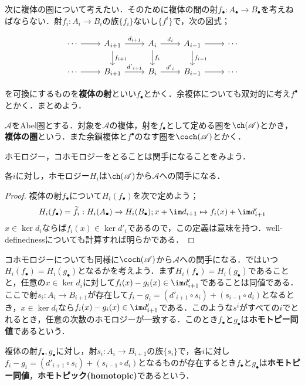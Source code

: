 
次に複体の圏について考えたい．そのために複体の間の射$f_\bullet:A_\bullet\to B_\bullet$を考えねばならない．射$f_i:A_i\to B_i$の族$\{f_i\}$ないし$\{f^i\}$で，次の図式；

\[\begin{tikzcd}
	\cdots\arrow[r]&A_{i+1}\arrow[r,"d_{i+1}"]\arrow[d,"f_{i+1}"]&A_i\arrow[r,"d_i"]\arrow[d,"f_i"]&A_{i-1}\arrow[r]\arrow[d,"f_{i-1}"]&\cdots\\
	\cdots\arrow[r]&B_{i+1}\arrow[r,"{d'}_{i+1}"]&B_i\arrow[r,"{d'}_{i}"]&B_{i-1}\arrow[r]&\cdots
\end{tikzcd}\]

を可換にするものを\textbf{複体の射}といい$f_\bullet$とかく．余複体についても双対的に考え$f^\bullet$とかく．まとめよう．
\begin{defi}[複体の圏]
	$\mathscr{A}$をAbel圏とする．対象を$\mathscr{A}$の複体，射を$f_\bullet$として定める圏を$\ch(\mathscr{A})$とかき，\textbf{複体の圏}という．また余鎖複体と$f^\bullet$のなす圏を$\coch(\mathscr{A})$とかく．
\end{defi}

ホモロジー，コホモロジーをとることは関手になることをみよう．
\begin{prop}
	各$i$に対し，ホモロジー$H_i$は$\ch(\mathscr{A})$から$\mathscr{A}$への関手になる．
\end{prop}
\begin{proof}
	複体の射$f_\bullet$について$H_i(f_\bullet)$を次で定めよう；
	\[H_i(f_\bullet)=\widetilde{f}_i:H_i(A_\bullet)\to H_i(B_\bullet);x+\im d_{i+1}\mapsto f_i(x)+\im d_{i+1}'\]
	$x\in\ker d_i$ならば$f_i(x)\in\ker d'_i$であるので，この定義は意味を持つ．well-definednessについても計算すれば明らかである．
\end{proof}

コホモロジーについても同様に$\coch(\mathscr{A})$から$\mathscr{A}$への関手になる．ではいつ$H_i(f_\bullet)=H_i(g_\bullet)$となるかを考えよう．まず$H_i(f_\bullet)=H_i(g_\bullet)$であることと，任意の$x\in\ker d_i$に対して$f_i(x)-g_i(x)\in\im d'_{i+1}$であることは同値である．ここで射$s_i:A_i\to B_{i+1}$が存在して$f_i-g_i=(d'_{i+1}\circ s_i)+(s_{i-1}\circ d_i)$となるとき，$x\in\ker d_i$なら$f_i(x)-g_i(x)\in\im d'_{i+1}$である．このような$s^i$がすべての$i$でとれるとき，任意の次数のホモロジーが一致する．このとき$f_\bullet$と$g_\bullet$は\textbf{ホモトピー同値}であるという．
\begin{defi}[ホモトピー同値]
	複体の射$f_\bullet,g_\bullet$に対し，射$s_i:A_i\to B_{i+1}$の族$\{s_i\}$で，各$i$に対し$f_i-g_i=(d'_{i+1}\circ s_i)+(s_{i-1}\circ d_i)$となるものが存在するとき$f_\bullet$と$g_\bullet$は\textbf{ホモトピー同値}，\textbf{ホモトピック(homotopic)}であるという．
\end{defi}

